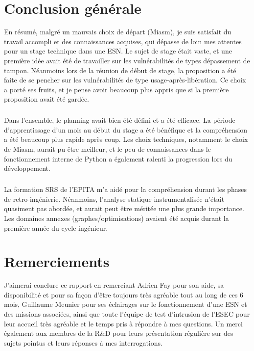 \section{Conclusion générale}
En résumé, malgré un mauvais choix de départ (Miasm), je suis satisfait du travail accompli et des connaissances acquises, qui dépasse de loin mes attentes pour un stage technique dans une ESN.
Le sujet de stage était vaste, et une première idée avait été de travailler sur les vulnérabilités de types dépassement de tampon. Néanmoins lors de la réunion de début de stage, la proposition a été
faite de se pencher sur les vulnérabilités de type usage-après-libération. Ce choix a porté ses fruits, et je pense avoir beaucoup plus appris que si la première proposition avait été gardée.
\subparagraph{}
Dans l'ensemble, le planning avait bien été défini et a été efficace. La période d'apprentissage d'un mois au début du stage a été bénéfique et la compréhension a été beaucoup plus rapide
après coup. Les choix techniques, notamment le choix de Miasm, aurait pu être meilleur, et le peu de connaissances dans le fonctionnement interne de Python a également ralenti la progression
lors du développement.
\subparagraph{}
La formation SRS de l'EPITA m'a aidé pour la compréhension durant les phases de retro-ingénierie. Néanmoins, l'analyse statique instrumentalisée n'était quasiment pas abordée, et aurait peut être
méritée une plus grande importance. Les domaines annexes (graphes/optimisations) avaient été acquis durant la première année du cycle ingénieur.

\section{Remerciements}
J'aimerai conclure ce rapport en remerciant Adrien Fay pour son aide, sa disponibilité et pour sa façon d'être toujours très agréable tout au long de ces 6 mois,
Guillaume Meunier pour ses éclairages sur le fonctionnement d'une ESN et des missions associées, ainsi que toute l'équipe de test d'intrusion de l'ESEC pour leur accueil très agréable et le temps
pris à répondre à mes questions. Un merci également aux membres de la R\&D pour leurs présentation régulière sur des sujets pointus et leurs réponses à mes interrogations.
